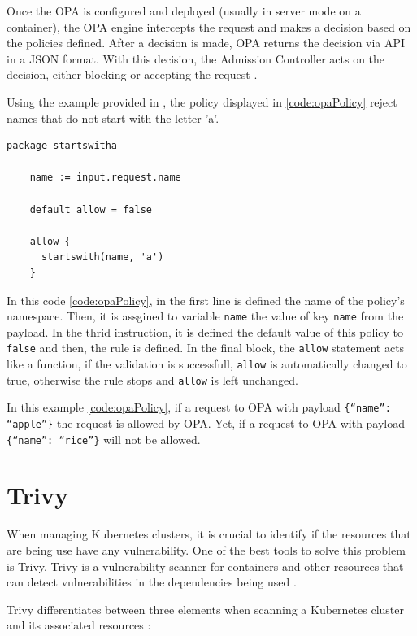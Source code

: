 \documentclass[a4paper,11pt,openright,BCOR=15mm]{scrbook}
\begin{document}
Once the OPA is configured and deployed (usually in server mode on a container), the OPA engine intercepts the request and makes a decision based on the policies defined. After a decision is made, OPA returns the decision via API in a JSON format. With this decision, the Admission Controller acts on the decision, either blocking or accepting the request \cite{opa_doc_guides_nodate}.

Using the example provided in \cite{bruner_better_2020}, the policy displayed in \ref{code:opaPolicy} reject names that do not start with the letter 'a'.

\begin{lstlisting}[style=yaml,caption={OPA policy example},label=code:opaPolicy]
	package startswitha
	
	name := input.request.name
	
	default allow = false
	
	allow {
	  startswith(name, 'a')
	}
\end{lstlisting}

In this code \ref{code:opaPolicy}, in the first line is defined the name of the policy's namespace. Then, it is assgined to variable \texttt{name} the value of key \texttt{name} from the payload. In the thrid instruction, it is defined the default value of this policy to \texttt{false} and then, the rule is defined. In the final block, the \texttt{allow} statement acts like a function, if the validation is successfull, \texttt{allow} is automatically changed to true, otherwise the rule stops and \texttt{allow} is left unchanged.

In this example \ref{code:opaPolicy}, if a request to OPA with payload \texttt{\{``name'': ``apple''\}} the request is allowed by OPA. Yet, if a request to OPA with payload \texttt{\{``name'': ``rice''\}} will not be allowed.


\section{Trivy}\label{sect:complementMonitor}

When managing Kubernetes clusters, it is crucial to identify if the resources that are being use have any vulnerability. One of the best tools to solve this problem is Trivy. Trivy is a vulnerability scanner for containers and other resources that can detect vulnerabilities in the dependencies being used \cite{benhassan_deep_2024}.

Trivy differentiates between three elements when scanning a Kubernetes cluster and its associated resources \cite{trivy_doc_kubernetes_nodate}:
\end{document}

